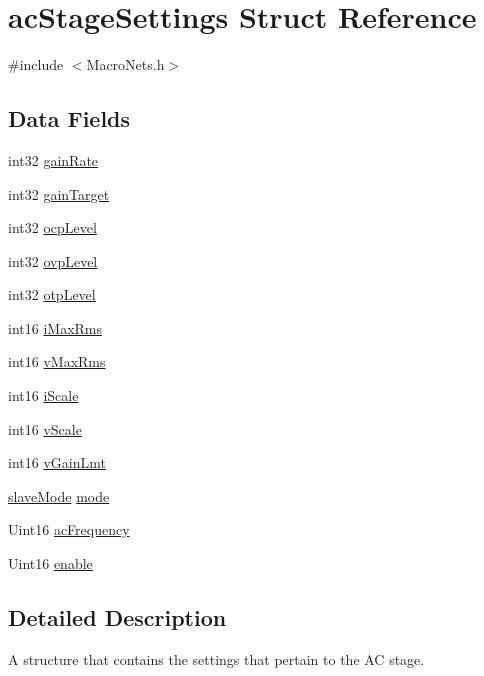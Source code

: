 \hypertarget{a00004}{\section{ac\-Stage\-Settings Struct Reference}
\label{a00004}
}


{\ttfamily \#include $<$Macro\-Nets.\-h$>$}

\subsection*{Data Fields}
\begin{DoxyCompactItemize}
\item 
int32 \hyperlink{a00004_a79680d88a9281cf5f6705881261b65db}{gain\-Rate}
\item 
int32 \hyperlink{a00004_af2ee8eeee892bf7f43e53bffdfa9993b}{gain\-Target}
\item 
int32 \hyperlink{a00004_a96fd85bb29c3f2ce0515eedbc353cd9f}{ocp\-Level}
\item 
int32 \hyperlink{a00004_a8b5f24f22b2b5c641cb4b81d27a13ff7}{ovp\-Level}
\item 
int32 \hyperlink{a00004_a650064b66038e3805f5bd42459d01bb4}{otp\-Level}
\item 
int16 \hyperlink{a00004_a9a07b0fd154720204a362df5217d2079}{i\-Max\-Rms}
\item 
int16 \hyperlink{a00004_ada3ef104bd8a8b682745bff081ec5ad7}{v\-Max\-Rms}
\item 
int16 \hyperlink{a00004_ade324e2ab9ea9a6d3620cf7028cc4c1d}{i\-Scale}
\item 
int16 \hyperlink{a00004_ad5f818e5589d223d11291bce3a7b3089}{v\-Scale}
\item 
int16 \hyperlink{a00004_ae3baa80fd1636154afd892c7362ca82c}{v\-Gain\-Lmt}
\item 
\hyperlink{a00047_aca06f1f459e3a5a5af6da9c575e60754}{slave\-Mode} \hyperlink{a00004_a3cb6e49a13279ff6c21dfdb9ee7f2f83}{mode}
\item 
Uint16 \hyperlink{a00004_a87713ff5f537563733a303ba762fdeb5}{ac\-Frequency}
\item 
Uint16 \hyperlink{a00004_a77d8744d531e699816cfcff31ccb6360}{enable}
\end{DoxyCompactItemize}


\subsection{Detailed Description}
A structure that contains the settings that pertain to the A\-C stage. 

